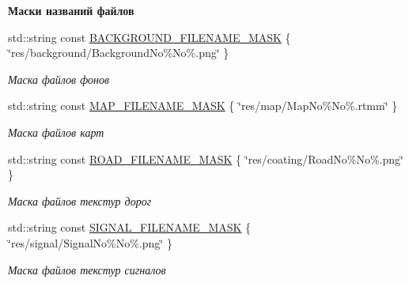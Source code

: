 \begin{Indent}\textbf{ Маски названий файлов}\par
\begin{DoxyCompactItemize}
\item 
\mbox{\label{namespacertm_a100c48b48ca5735bfdf3d809fa5dae58}} 
std\+::string const \hyperlink{namespacertm_a100c48b48ca5735bfdf3d809fa5dae58}{B\+A\+C\+K\+G\+R\+O\+U\+N\+D\+\_\+\+F\+I\+L\+E\+N\+A\+M\+E\+\_\+\+M\+A\+SK} \{ \char`\"{}res/background/Background\+No\%No\%.png\char`\"{} \}
\begin{DoxyCompactList}\small\item\em Маска файлов фонов \end{DoxyCompactList}\item 
\mbox{\label{namespacertm_ae29fce52eae57c27a760b021b774ca4e}} 
std\+::string const \hyperlink{namespacertm_ae29fce52eae57c27a760b021b774ca4e}{M\+A\+P\+\_\+\+F\+I\+L\+E\+N\+A\+M\+E\+\_\+\+M\+A\+SK} \{ \char`\"{}res/map/Map\+No\%No\%.rtmm\char`\"{} \}
\begin{DoxyCompactList}\small\item\em Маска файлов карт \end{DoxyCompactList}\item 
\mbox{\label{namespacertm_acd3fb4c773d00c98945d16d14a03f380}} 
std\+::string const \hyperlink{namespacertm_acd3fb4c773d00c98945d16d14a03f380}{R\+O\+A\+D\+\_\+\+F\+I\+L\+E\+N\+A\+M\+E\+\_\+\+M\+A\+SK} \{ \char`\"{}res/coating/Road\+No\%No\%.png\char`\"{} \}
\begin{DoxyCompactList}\small\item\em Маска файлов текстур дорог \end{DoxyCompactList}\item 
\mbox{\label{namespacertm_aa9d61ca4243a3f2479f27c61535fcc9d}} 
std\+::string const \hyperlink{namespacertm_aa9d61ca4243a3f2479f27c61535fcc9d}{S\+I\+G\+N\+A\+L\+\_\+\+F\+I\+L\+E\+N\+A\+M\+E\+\_\+\+M\+A\+SK} \{ \char`\"{}res/signal/Signal\+No\%No\%.png\char`\"{} \}
\begin{DoxyCompactList}\small\item\em Маска файлов текстур сигналов \end{DoxyCompactList}\item 
\mbox{\label{namespacertm_a7a49fe0b8d4f52458bfc22145e46faf5}} 

\end{DoxyCompactItemize}
\end{Indent}
